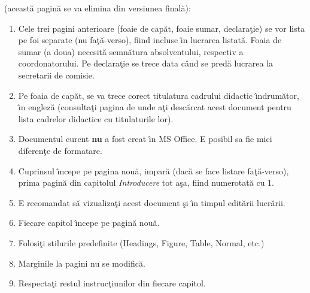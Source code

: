 { (aceast\u{a} pagin\u{a} se va elimina din versiunea final\u{a})}:
\begin{enumerate}
 \item Cele trei pagini anterioare (foaie de cap\u{a}t, foaie sumar, declara\c{t}ie) se vor lista pe foi separate (nu fa\c{t}\u{a}-verso), fiind incluse \^{\i}n lucrarea listat\u{a}. 
 Foaia de sumar (a doua) necesit\u{a} semn\u{a}tura absolventului, respectiv a coordonatorului.
 Pe declara\c{t}ie se trece data c\^{a}nd se pred\u{a} lucrarea la secretarii de comisie.
 \item Pe foaia de cap\u{a}t, se va trece corect titulatura cadrului didactic \^{\i}ndrum\u{a}tor, \^{\i}n englez\u{a} (consulta\c{t}i pagina de unde a\c{t}i desc\u{a}rcat acest document pentru lista cadrelor didactice cu titulaturile lor).
 \item Documentul curent {\bf nu} a fost creat \^{\i}n MS Office. E posibil sa fie mici diferen\c{t}e de formatare. 
\item Cuprinsul \^{\i}ncepe pe pagina nou\u{a}, impar\u{a} (dac\u{a} se face listare fa\c{t}\u{a}-verso), prima pagin\u{a} din capitolul \emph{Introducere} tot a\c{s}a, fiind numerotat\u{a} cu 1. %
\item E recomandat s\u{a} vizualiza\c{t}i acest document \c{s}i \^{\i}n timpul edit\u{a}rii lucr\u{a}rii. %
\item Fiecare capitol \^{\i}ncepe pe pagin\u{a} nou\u{a}. %
\item Folosi\c{t}i stilurile predefinite (Headings, Figure, Table, Normal, etc.)
\item Marginile la pagini nu se modific\u{a}.
\item Respecta\c{t}i restul instruc\c{t}iunilor din fiecare capitol.
\end{enumerate}
\thispagestyle{empty}